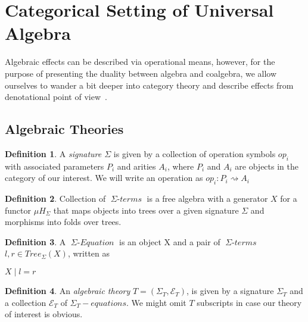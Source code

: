 \documentclass[declaration,shortabstract]{iithesis}
\theoremstyle{definition} \newtheorem{definition}{Definition}[chapter]
\theoremstyle{remark} \newtheorem{remark}[definition]{Observation}
\theoremstyle{plain} \newtheorem{theorem}[definition]{Theorem}
\theoremstyle{plain} \newtheorem{lemma}[definition]{Lemma}
\newcommand{\mathVar}[1]{{\operatorname{\mathit{#1}}}}
\begin{document}
\section{Categorical Setting of Universal Algebra}

Algebraic effects can be described via operational means, however,
for the purpose of presenting the duality between algebra and coalgebra,
we allow ourselves to wander a bit deeper into category theory and describe
effects from denotational point of view~\cite{bauer-what-is-algebraic}.

    \subsection{Algebraic Theories}

    \begin{definition}

    A \textit{signature $ \Sigma $} is given by a collection of operation
    symbols $ op_{i} $ with associated parameters $ P_{i} $ and arities $ A_{i} $,
    where $ P_{i} $ and $ A_{i} $ are objects in the category of our interest.
    We will write an operation as $ op_{i} : P_{i} \rightsquigarrow A_{i} $

    \end{definition}

    \begin{definition}
    Collection of $\mathVar{\Sigma-terms}$ is a free algebra with a generator $X$
    for a functor $ \mu H_{\Sigma} $ that maps objects into trees over a given
    signature $ \Sigma $ and morphisms into folds over trees.

    \end{definition}

    \begin{definition}

        A $ \mathVar{\Sigma-Equation} $ is an object X and a pair of
        $\mathVar{\Sigma-terms}$ $l, r \in Tree_{\Sigma}(X)$, written as

        \begin{center}
        $ X \mid l = r $
        \end{center}

    \end{definition}

    \begin{definition}

    An \textit{algebraic theory} $T = (\Sigma_{T}, \mathcal{E}_{T})$, is given
    by a signature $\Sigma_{T}$ and a collection $\mathcal{E}_{T}$ of
    $\mathVar{\Sigma_{T}-equations}$. We might omit $T$ subscripts in case
    our theory of interest is obvious.

    \end{definition}
\end{document}
